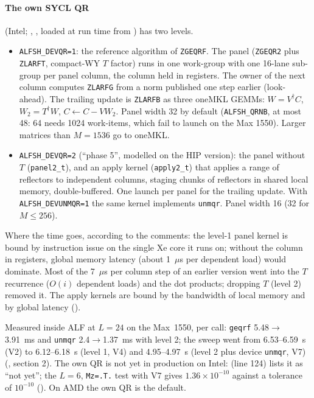 \paragraph{The own SYCL QR} (Intel; , , loaded at run time from ) has two levels.
\begin{itemize}
\item \texttt{ALFSH\_DEVQR=1}: the reference algorithm of \texttt{ZGEQRF}. The panel (\texttt{ZGEQR2} plus \texttt{ZLARFT}, compact-WY $T$ factor) runs in one work-group with one 16-lane sub-group per panel column, the column held in registers. The owner of the next column computes \texttt{ZLARFG} from a norm published one step earlier (look-ahead). The trailing update is \texttt{ZLARFB} as three oneMKL GEMMs: $W=V^\dagger C$, $W_2=T^\dagger W$, $C\leftarrow C-VW_2$. Panel width 32 by default (\texttt{ALFSH\_QRNB}, at most 48: 64 needs 1024 work-items, which fail to launch on the Max 1550). Larger matrices than $M=1536$ go to oneMKL.
\item \texttt{ALFSH\_DEVQR=2} (``phase 5'', modelled on the HIP version): the panel without $T$ (\texttt{panel2\_t}), and an apply kernel (\texttt{apply2\_t}) that applies a range of reflectors to independent columns, staging chunks of reflectors in shared local memory, double-buffered. One launch per panel for the trailing update. With \texttt{ALFSH\_DEVUNMQR=1} the same kernel implements \texttt{unmqr}. Panel width 16 (32 for $M\le256$).
\end{itemize}
Where the time goes, according to the comments: the level-1 panel kernel is bound by instruction issue on the single Xe core it runs on; without the column in registers, global memory latency (about 1~$\mu$s per dependent load) would dominate. Most of the 7~$\mu$s per column step of an earlier version went into the $T$ recurrence ($O(i)$ dependent loads) and the dot products; dropping $T$ (level 2) removed it. The apply kernels are bound by the bandwidth of local memory and by global latency ().

Measured inside ALF at $L=24$ on the Max~1550, per call: \texttt{geqrf} 5.48$\to$3.91~ms and \texttt{unmqr} 2.4$\to$1.37~ms with level 2; the sweep went from 6.53--6.59~s (V2) to 6.12--6.18~s (level 1, V4) and 4.95--4.97~s (level 2 plus device \texttt{unmqr}, V7) (, section 2). %
The own QR is not yet in production on Intel:  (line 124) lists it as ``not yet''; the $L=6$, \texttt{Mz=.T.} test with V7 gives $1.36\times10^{-10}$ against a tolerance of $10^{-10}$ (). %
On AMD the own QR is the default.


